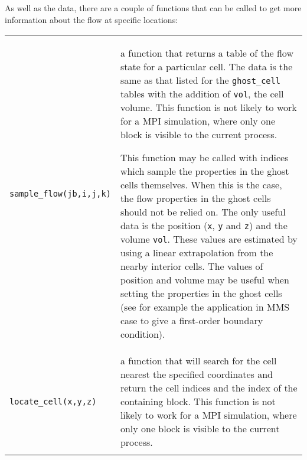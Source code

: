 \noindent
As well as the data, there are a couple of functions that can be called to get more information about
the flow at specific locations:\\
\begin{tabular}{ll} 
 \noalign{\smallskip} \hline \noalign{\smallskip}
 \texttt{sample\_flow(jb,i,j,k)} & \parbox{10cm}{a function that returns a table of 
                                      the flow state for a particular cell.  The data is the same as that
                                      listed for the \texttt{ghost\_cell} tables with the addition of \texttt{vol},
                                      the cell volume.  This function is not likely to work for a MPI simulation,
                                      where only one block is visible to the current process.

                                      This function may be called with indices which sample the properties
                                      in the ghost cells themselves. When this is the case, the flow properties
                                      in the ghost cells should not be relied on. The only useful data is
                                      the position (\texttt{x}, \texttt{y} and \texttt{z}) and the volume
                                      \texttt{vol}. These values are estimated by using a linear extrapolation
                                      from the nearby interior cells. The values of position and volume may
                                      be useful when setting the properties in the ghost cells (see for
                                      example the application in MMS case to give a first-order boundary
                                      condition).
                                                                             

} \\
 \noalign{\smallskip} \hline \noalign{\smallskip}
 \texttt{locate\_cell(x,y,z)} & \parbox{10cm}{a function that will search for the cell nearest 
                                      the specified coordinates and return the cell indices
                                      and the index of the containing block.  This function 
                                      is not likely to work for a MPI simulation,
                                      where only one block is visible to the current process.} \\
 \noalign{\smallskip} \hline \noalign{\smallskip}
\end{tabular}

